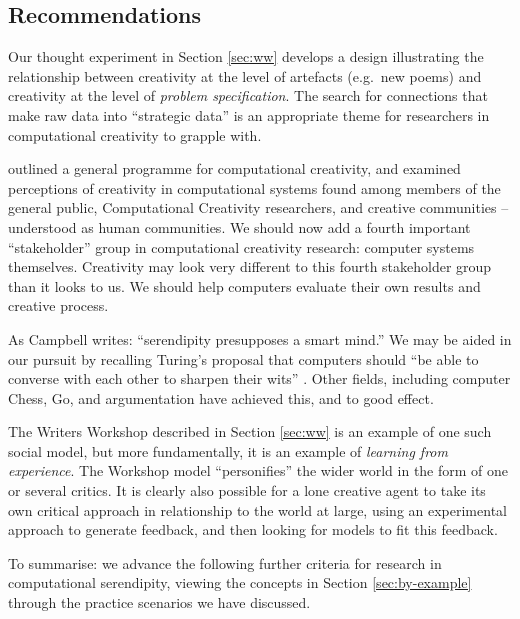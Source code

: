 \subsection{Recommendations} \label{sec:recommendations}

Our thought experiment in Section \ref{sec:ww} develops a design
illustrating the relationship between creativity at the level of
artefacts (e.g.~new poems) and creativity at the level of
\emph{problem specification}.  The search for connections that make
raw data into ``strategic data'' is an appropriate theme for
researchers in computational creativity to grapple with.

 outlined a general programme
for computational creativity, and examined perceptions of creativity
in computational systems found among members of the general public,
Computational Creativity researchers, and creative communities --
understood as human communities.  We should now add a fourth important
``stakeholder'' group in computational creativity research: computer
systems themselves.  Creativity may look very different to this fourth
stakeholder group than it looks to us.  We should help computers
evaluate their own results and creative process.

As Campbell \citeyear{campbell} writes: ``serendipity
presupposes a smart mind.''  We may be aided in our pursuit by
recalling Turing's proposal that computers should ``be able to
converse with each other to sharpen their wits''
\cite{turing-intelligent}.  Other fields, including computer Chess,
Go, and argumentation have achieved this, and to good effect.

The Writers Workshop described in Section \ref{sec:ww} is an example
of one such social model, but more fundamentally, it is an example of
\emph{learning from experience}.  The Workshop model ``personifies''
the wider world in the form of one or several critics.  It is clearly
also possible for a lone creative agent to take its own critical
approach in relationship to the world at large, using an experimental
approach to generate feedback, and then looking for models to fit this
feedback.

To summarise: we advance the following further criteria for research
in computational serendipity, viewing the concepts in Section
\ref{sec:by-example} through the practice scenarios we have discussed.

